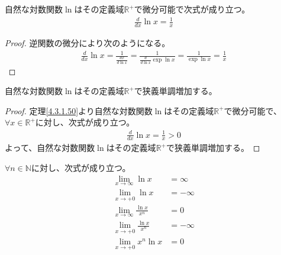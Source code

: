 \documentclass[dvipdfmx]{jsarticle}
\begin{document}
\begin{thm}\label{4.3.1.50}
自然な対数関数$\ln$はその定義域$\mathbb{R}^{+}$で微分可能で次式が成り立つ。
\begin{align*}
\frac{d}{dx}\ln x = \frac{1}{x}
\end{align*}
\end{thm}
\begin{proof} 逆関数の微分により次のようになる。
\begin{align*}
\frac{d}{dx}\ln x = \frac{1}{\frac{dx}{d\ln x}} = \frac{1}{\frac{d}{d\ln x}\exp{\ln x}} = \frac{1}{\exp{\ln x}} = \frac{1}{x}
\end{align*}
\end{proof}
\begin{thm}\label{4.3.1.51}
自然な対数関数$\ln$はその定義域$\mathbb{R}^{+}$で狭義単調増加する。
\end{thm}
\begin{proof} 定理\ref{4.3.1.50}より自然な対数関数$\ln$はその定義域$\mathbb{R}^{+}$で微分可能で、$\forall x \in \mathbb{R}^{+}$に対し、次式が成り立つ。
\begin{align*}
\frac{d}{dx}\ln x = \frac{1}{x} > 0
\end{align*}
よって、自然な対数関数$\ln$はその定義域$\mathbb{R}^{+}$で狭義単調増加する。
\end{proof}
\begin{thm}\label{4.3.1.52} $\forall n \in \mathbb{N}$に対し、次式が成り立つ。
\begin{align*}
\lim_{x \rightarrow \infty}{\ln x} &= \infty\\
\lim_{x \rightarrow + 0}{\ln x} &= - \infty\\
\lim_{x \rightarrow \infty}\frac{\ln x}{x^{n}} &= 0\\
\lim_{x \rightarrow + 0}\frac{\ln x}{x^{n}} &= - \infty\\
\lim_{x \rightarrow + 0}{x^{n}\ln x} &= 0
\end{align*}
\end{thm}
\end{document}
